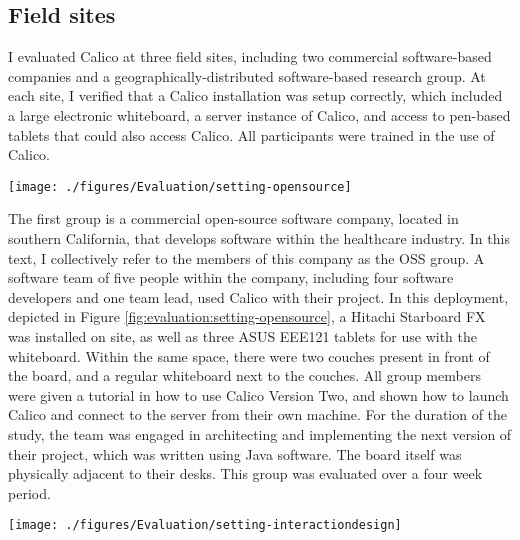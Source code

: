 \subsection{Field sites}

I evaluated Calico at three field sites, including two commercial software-based companies and a geographically-distributed software-based research group. At each site, I verified that a Calico installation was setup correctly, which included a large electronic whiteboard, a server instance of Calico, and access to pen-based tablets that could also access Calico. All participants were trained in the use of Calico.

\begin{figure*}[tbh]
  \centering
  \texttt{[image: ./figures/Evaluation/setting-opensource]}
  \caption{TODO: HAVE GERALD APPROVE IMAGE The physical setup of the OSS group}
  \label{fig:evaluation:setting-opensource}
\end{figure*}

The first group is a commercial open-source software company, located in southern California, that develops software within the healthcare industry. In this text, I collectively refer to the members of this company as the OSS group. A software team of five people within the company, including four software developers and one team lead, used Calico with their project. In this deployment, depicted in Figure \ref{fig:evaluation:setting-opensource}, a Hitachi Starboard FX was installed on site, as well as three ASUS EEE121 tablets for use with the whiteboard. Within the same space, there were two couches present in front of the board, and a regular whiteboard next to the couches. All group members were given a tutorial in how to use Calico Version Two, and shown how to launch Calico and connect to the server from their own machine.  For the duration of the study, the team was engaged in architecting and implementing the next version of their project, which was written using Java software. The board itself was physically adjacent to their desks. This group was evaluated over a four week period.

\begin{figure*}[tbh]
  \centering
  \texttt{[image: ./figures/Evaluation/setting-interactiondesign]}
  \caption{TODO: HAVE JIM APPROVE IMAGE A tutorial of the usage of Calico given to the interaction design group}
  \label{fig:evaluation:setting-interactiondesign}
\end{figure*}

